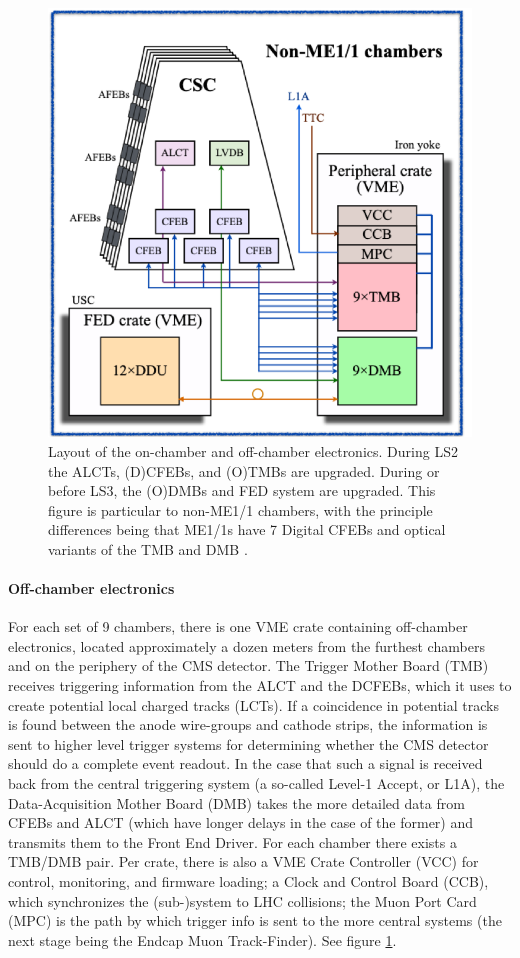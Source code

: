 \documentclass[a4paper,11pt]{article}
\begin{document}
\begin{figure}[htbp]
\centering %
\qquad
\includegraphics[width=.6\textwidth]{Electronics.png}
\caption{\label{fig:electronics} Layout of the on-chamber and off-chamber electronics. During LS2 the ALCTs, (D)CFEBs, and (O)TMBs are upgraded. During or before LS3, the (O)DMBs and FED system are upgraded. This figure is particular to non-ME1/1 chambers, with the principle differences being that ME1/1s have 7 Digital CFEBs and optical variants of the TMB and DMB \cite{tdr}.}
\end{figure}

\paragraph{Off-chamber electronics}
For each set of 9 chambers, there is one VME crate containing off-chamber electronics, located approximately a dozen meters from the furthest chambers and on the periphery of the CMS detector.
The Trigger Mother Board (TMB) receives triggering information from the ALCT and the DCFEBs, which it uses to create  potential local charged tracks (LCTs). If a coincidence in potential tracks is found between the anode wire-groups and cathode strips, the information is sent to higher level trigger systems for determining whether the CMS detector should do a complete event readout. In the case that such a signal is received back from the central triggering system (a so-called Level-1 Accept, or L1A), the
Data-Acquisition Mother Board (DMB) takes the more detailed data from CFEBs and ALCT (which have longer delays in the case of the former) and transmits them to the Front End Driver. For each chamber there exists a TMB/DMB pair. Per crate, there is also a 
VME Crate Controller (VCC) for control, monitoring, and firmware loading; a Clock and Control Board (CCB), which synchronizes the (sub-)system to LHC collisions; the Muon Port Card (MPC) is the path by which trigger info is sent to the more central systems (the next stage being the Endcap Muon Track-Finder). See figure \ref{fig:electronics}.
\end{document}
